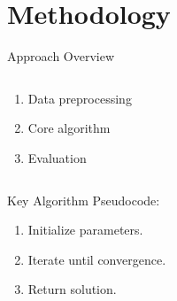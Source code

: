 \section{Methodology}

\begin{frame}{Approach Overview}
  \begin{columns}[T]
    \begin{column}{0.55\textwidth}
      \begin{enumerate}
        \item Data preprocessing
        \item Core algorithm
        \item Evaluation
      \end{enumerate}
    \end{column}
    \begin{column}{0.4\textwidth}
    \end{column}
  \end{columns}
\end{frame}

\begin{frame}{Key Algorithm}
  Pseudocode:
  \begin{enumerate}
    \item Initialize parameters.
    \item Iterate until convergence.
    \item Return solution.
  \end{enumerate}
\end{frame}
